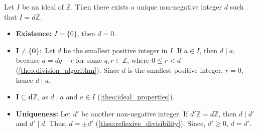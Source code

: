 \begin{theo}

    \label{theo:ideal_generator}

    Let \( I \) be an ideal of \( \mathbb{Z} \). Then there exists a unique non-negative integer \( d \) such that \( I = d\mathbb{Z} \).
\end{theo}

\begin{Proof}
    \begin{itemize}
        \item \textbf{Existence:} $I=\{0\}$, then $d = 0$.
        \item $\mathbf{I \neq \{0\}:}$ Let $d$ be the smallest positive integer in $I$. 
        If $a\in I$, then $d\mid a$, because  $a = dq + r$ for some $q,r\in\mathbb{Z}$, where $0\leq r < d$ (\ref{theo:division_algorithm}).
        Since $d$ is the smallest positive integer, $r = 0$, hence $d\mid a$.
        \item $\mathbf{I\subseteq d\mathbb{Z}}$, as $d\mid a$ and $a\in I$ (\ref{theo:ideal_properties}).
        \item \textbf{Uniqueness:} Let $d'$ be another non-negative integer. If $d'\mathbb{Z}=d\mathbb{Z}$,
        then $d\mid d'$ and $d'\mid d$. Thus, $d=\pm d'$ (\ref{theo:reflexive_divisibility}). Since, $d'\geq0$, $d=d'$.
    \end{itemize}
    

\end{Proof}



